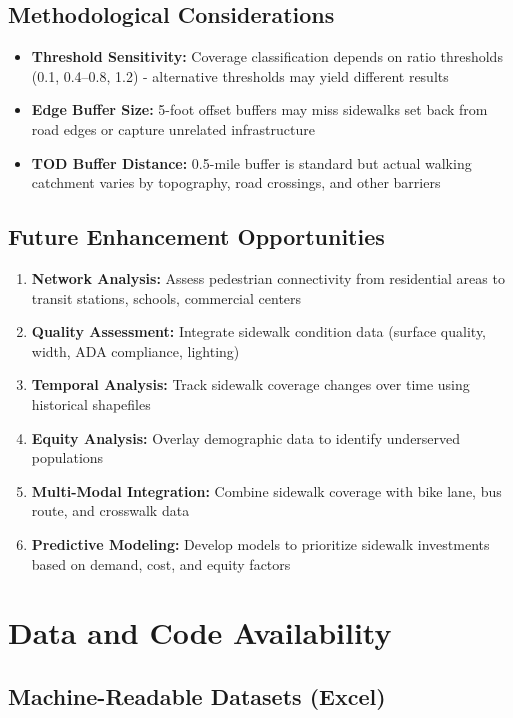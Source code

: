 \documentclass[11pt,letterpaper]{article}
\begin{document}
\subsection{Methodological Considerations}

\begin{itemize}
    \item \textbf{Threshold Sensitivity:} Coverage classification depends on ratio thresholds (0.1, 0.4--0.8, 1.2) - alternative thresholds may yield different results
    \item \textbf{Edge Buffer Size:} 5-foot offset buffers may miss sidewalks set back from road edges or capture unrelated infrastructure
    \item \textbf{TOD Buffer Distance:} 0.5-mile buffer is standard but actual walking catchment varies by topography, road crossings, and other barriers
\end{itemize}

\subsection{Future Enhancement Opportunities}

\begin{enumerate}
    \item \textbf{Network Analysis:} Assess pedestrian connectivity from residential areas to transit stations, schools, commercial centers
    \item \textbf{Quality Assessment:} Integrate sidewalk condition data (surface quality, width, ADA compliance, lighting)
    \item \textbf{Temporal Analysis:} Track sidewalk coverage changes over time using historical shapefiles
    \item \textbf{Equity Analysis:} Overlay demographic data to identify underserved populations
    \item \textbf{Multi-Modal Integration:} Combine sidewalk coverage with bike lane, bus route, and crosswalk data
    \item \textbf{Predictive Modeling:} Develop models to prioritize sidewalk investments based on demand, cost, and equity factors
\end{enumerate}

\section{Data and Code Availability}

\subsection{Machine-Readable Datasets (Excel)}
\end{document}
